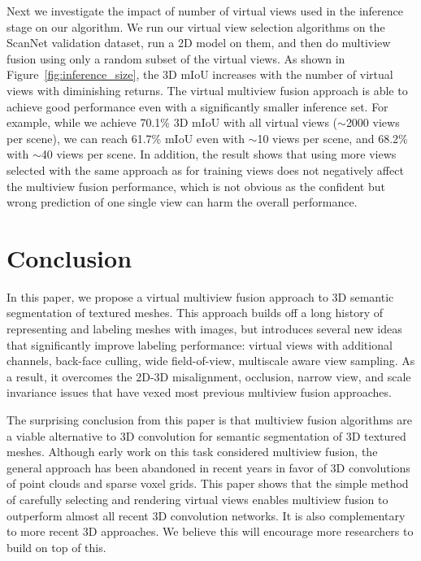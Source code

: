 \documentclass[runningheads]{llncs}
\begin{document}
Next we investigate the impact of number of virtual views used in the inference stage on our algorithm. We run our virtual view selection algorithms on the ScanNet validation dataset, run a 2D model on them, and then do multiview fusion using only a random subset of the virtual views. As shown in Figure~\ref{fig:inference_size}, the 3D mIoU increases with the number of virtual views with diminishing returns. The virtual multiview fusion approach is able to achieve good performance even with a significantly smaller inference set. For example, while we achieve 70.1\% 3D mIoU with all virtual views ($\sim$2000 views per scene), we can reach 61.7\% mIoU even with $\sim$10 views per scene, and 68.2\% with $\sim$40 views per scene. In addition, the result shows that using more views selected with the same approach as for training views does not negatively affect the multiview fusion performance, which is not obvious as the confident but wrong prediction of one single view can harm the overall performance.
 \section{Conclusion}\label{sec:conclusion}

In this paper, we propose a virtual multiview fusion approach to 3D semantic segmentation of textured meshes.   This approach builds off a long history of representing and labeling meshes with images, but introduces several new ideas that significantly improve labeling performance: virtual views with additional channels, back-face culling, wide field-of-view, multiscale aware view sampling.  As a result, it overcomes the 2D-3D misalignment, occlusion, narrow view, and scale invariance issues that have vexed most previous multiview fusion approaches.

The surprising conclusion from this paper is that multiview fusion algorithms are a viable alternative to 3D convolution for semantic segmentation of 3D textured meshes.  Although early work on this task considered multiview fusion, the general approach has been abandoned in recent years in favor of 3D convolutions of point clouds and sparse voxel grids. This paper shows that the simple method of carefully selecting and rendering virtual views enables multiview fusion to outperform almost all recent 3D convolution networks. It is also complementary to more recent 3D approaches. We believe this will encourage more researchers to build on top of this. 
\clearpage


\end{document}
